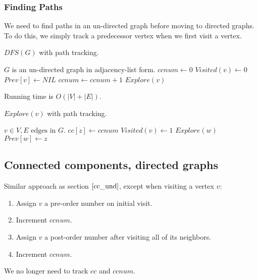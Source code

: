 \documentclass{article}
\theoremstyle{definition}
\begin{document}
\subsubsection{Finding Paths}
We need to find paths in an un-directed graph before moving to directed graphs. To do this, we simply track a predecessor vertex when we first visit a vertex.

\begin{algorithm}
	\caption{$DFS(G)$ with path tracking.}
	\begin{algorithmic}[1]
		\REQUIRE $G$ is an un-directed graph in adjacency-list form.
		\STATE $ccnum \gets 0$
		\STATE $Visited(v) \gets 0$
		\STATE $Prev[v] \gets NIL$
		\ENDFOR
		\STATE $ccnum \gets ccnum + 1$
		\STATE $Explore(v)$
		\ENDIF
		\ENDFOR
	\end{algorithmic}
	Running time is $O(|V|+|E|)$.
\end{algorithm}

\begin{algorithm}[H]
	\caption{$Explore(v)$ with path tracking.}
	\begin{algorithmic}[1]
		\REQUIRE $v \in V, E \text{ edges in } G$.
		\STATE $cc[z] \gets ccnum$  
		\STATE $Visited(v) \gets 1$
		\STATE $Explore(w)$
		\STATE $Prev[w] \gets z$
		\ENDIF
		\ENDFOR
	\end{algorithmic}
\end{algorithm}

\subsection{Connected components, directed graphs}
Similar approach as section $\ref{cc_und}$, except when visiting a vertex $v$: 
\begin{enumerate}
\item Assign $v$ a pre-order number on initial visit.
\item Increment $ccnum$.
\item Assign $v$ a post-order number after visiting all of its neighbors.
\item Increment $ccnum$.
\end{enumerate}
We no longer need to track $cc$ and $ccnum$.
\end{document}
